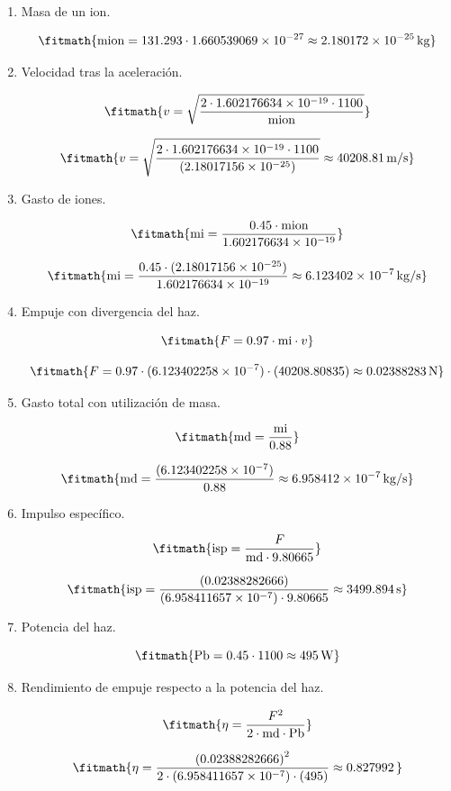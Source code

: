 \begin{enumerate}

\item Masa de un ion.

\[\fitmath{\mathrm{mion}=131.293\cdot 1.660539069\times10^{-27}\approx 2.180172\times10^{-25}\,\mathrm{kg}}\]

\item Velocidad tras la aceleración.

\[\fitmath{v=\sqrt{\frac{2\cdot 1.602176634\times10^{-19}\cdot 1100}{\mathrm{mion}}}}\]

\[\fitmath{v=\sqrt{\frac{2\cdot 1.602176634\times10^{-19}\cdot 1100}{(2.18017156\times10^{-25})}}\approx 40208.81\,\mathrm{m/s}}\]

\item Gasto de iones.

\[\fitmath{\mathrm{mi}=\frac{0.45\cdot \mathrm{mion}}{1.602176634\times10^{-19}}}\]

\[\fitmath{\mathrm{mi}=\frac{0.45\cdot (2.18017156\times10^{-25})}{1.602176634\times10^{-19}}\approx 6.123402\times10^{-7}\,\mathrm{kg/s}}\]

\item Empuje con divergencia del haz.

\[\fitmath{F=0.97\cdot \mathrm{mi}\cdot v}\]

\[\fitmath{F=0.97\cdot (6.123402258\times10^{-7})\cdot (40208.80835)\approx 0.02388283\,\mathrm{N}}\]

\item Gasto total con utilización de masa.

\[\fitmath{\mathrm{md}=\frac{\mathrm{mi}}{0.88}}\]

\[\fitmath{\mathrm{md}=\frac{(6.123402258\times10^{-7})}{0.88}\approx 6.958412\times10^{-7}\,\mathrm{kg/s}}\]

\item Impulso específico.

\[\fitmath{\mathrm{isp}=\frac{F}{\mathrm{md}\cdot 9.80665}}\]

\[\fitmath{\mathrm{isp}=\frac{(0.02388282666)}{(6.958411657\times10^{-7})\cdot 9.80665}\approx 3499.894\,\mathrm{s}}\]

\item Potencia del haz.

\[\fitmath{\mathrm{Pb}=0.45\cdot 1100\approx 495\,\mathrm{W}}\]

\item Rendimiento de empuje respecto a la potencia del haz.

\[\fitmath{\eta=\frac{{F}^{2}}{2\cdot \mathrm{md}\cdot \mathrm{Pb}}}\]

\[\fitmath{\eta=\frac{{(0.02388282666)}^{2}}{2\cdot (6.958411657\times10^{-7})\cdot (495)}\approx 0.827992\,}\]

\end{enumerate}

